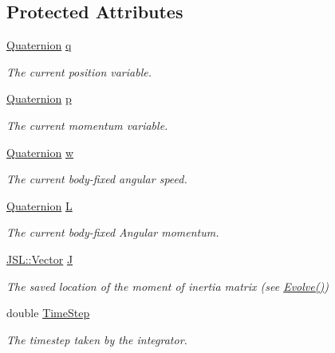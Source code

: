 \subsection*{Protected Attributes}
\begin{DoxyCompactItemize}
\item 
\hyperlink{classQDynamics_1_1Quaternion}{Quaternion} \hyperlink{classQDynamics_1_1Integrator_a5929511da076c7f31749a6da713fcff6}{q}
\begin{DoxyCompactList}\small\item\em The current position variable. \end{DoxyCompactList}\item 
\hyperlink{classQDynamics_1_1Quaternion}{Quaternion} \hyperlink{classQDynamics_1_1Integrator_a1fb07254408f6ad620eb9dbfa0f8da95}{p}
\begin{DoxyCompactList}\small\item\em The current momentum variable. \end{DoxyCompactList}\item 
\hyperlink{classQDynamics_1_1Quaternion}{Quaternion} \hyperlink{classQDynamics_1_1Integrator_a0241b2e2c87418323330999d1f8e12d0}{w}
\begin{DoxyCompactList}\small\item\em The current body-\/fixed angular speed. \end{DoxyCompactList}\item 
\hyperlink{classQDynamics_1_1Quaternion}{Quaternion} \hyperlink{classQDynamics_1_1Integrator_adb45dae4f4d1d37ab83ca5269f51058d}{L}
\begin{DoxyCompactList}\small\item\em The current body-\/fixed Angular momentum. \end{DoxyCompactList}\item 
\hyperlink{classJSL_1_1Vector}{J\+S\+L\+::\+Vector} \hyperlink{classQDynamics_1_1Integrator_a7b99b22475321b34c1624bded3489954}{J}
\begin{DoxyCompactList}\small\item\em The saved location of the moment of inertia matrix (see \hyperlink{classQDynamics_1_1Integrator_a4b921b312775194b77c2c85f93add84e}{Evolve()}) \end{DoxyCompactList}\item 
double \hyperlink{classQDynamics_1_1Integrator_a9b850dd4b29118e44b0183409db0a983}{Time\+Step}
\begin{DoxyCompactList}\small\item\em The timestep taken by the integrator. \end{DoxyCompactList}\item 

\end{DoxyCompactItemize}
